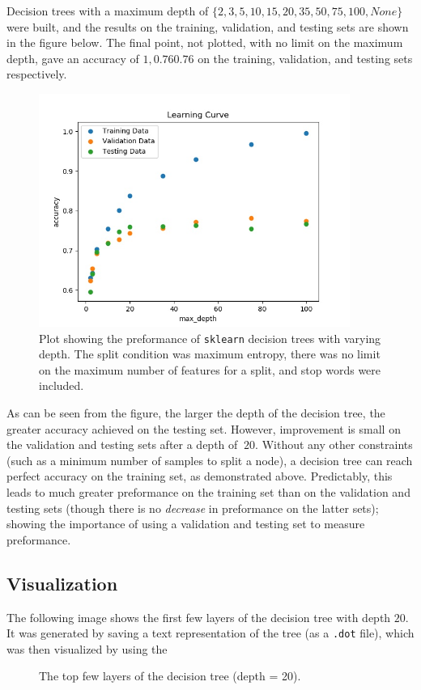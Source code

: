\documentclass{article}
\begin{document}
   Decision trees with a maximum depth of $\{ 2, 3, 5, 10, 15, 20, 35, 50, 75, 100, None \}$ were built, and
   the results on the training, validation, and testing sets are shown in the figure below. The final point,
   not plotted, with no limit on the maximum depth, gave an accuracy of $1, 0.76 0.76$ on the training,
   validation, and testing sets respectively.
      \begin{figure}[h] \centering

         \includegraphics[width=4in]{resources/part7/part7a_splitCondition=entropy_maxFeatures=None_stopWords=True}

         \caption{Plot showing the preformance of \texttt{sklearn} decision trees with
            varying depth. The split condition was maximum entropy, there was no limit on the maximum
            number of features for a split, and stop words were included.}
      \end{figure}
   As can be seen from the figure, the larger the depth of the decision tree, the greater accuracy achieved on
   the testing set. However, improvement is small on the validation and testing sets after a depth of
   $~20$. Without any other constraints (such as a minimum number of samples to split a node), a decision tree
   can reach perfect accuracy on the training set, as demonstrated above. Predictably, this leads to
   much greater preformance on the training set than on the validation and testing sets (though there is no
   \textit{decrease} in preformance on the latter sets); showing the importance of using a validation and testing
   set to measure preformance.

   \subsection{Visualization}
   The following image shows the first few layers of the decision tree with depth $20$. It was generated by saving
   a text representation of the tree (as a \texttt{.dot} file), which was then visualized by using the
      \begin{figure}[h] \centering
         \caption{The top few layers of the decision tree (depth = 20).}
         \label{part7b}
      \end{figure}
\end{document}
